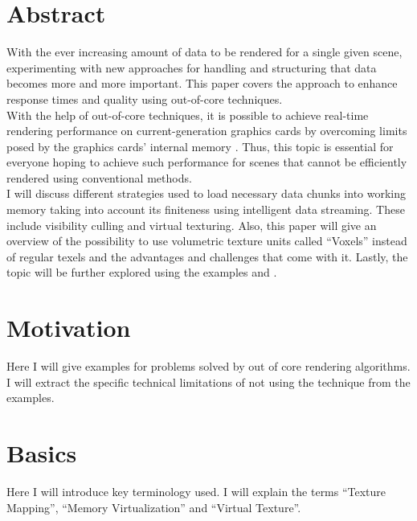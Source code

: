 
\chapter{Abstract}
\label{ch:Abstract}

With the ever increasing amount of data to be rendered for a single given scene, experimenting with new approaches for handling and structuring that data becomes more and more important. This paper covers the approach to enhance response times and quality using out-of-core techniques. \\

With the help of out-of-core techniques, it is possible to achieve real-time rendering performance on current-generation graphics cards by overcoming limits posed by the graphics cards' internal memory \cite{Crassin:2009:GRS:1507149.1507152}. Thus, this topic is essential for everyone hoping to achieve such performance for scenes that cannot be efficiently rendered using conventional methods. \\

I will discuss different strategies used to load necessary data chunks into working memory taking into account its finiteness using intelligent data streaming. These include visibility culling and virtual texturing. Also, this paper will give an overview of the possibility to use volumetric texture units called ``Voxels'' instead of regular texels and the advantages and challenges that come with it. Lastly, the topic will be further explored using the examples \cite{Crassin:2009:GRS:1507149.1507152} and \cite{van2009id}.
%



\chapter{Motivation}
\label{ch:Motivation}

Here I will give examples for problems solved by out of core rendering algorithms. I will extract the specific technical limitations of not using the technique from the examples.

\chapter{Basics}
\label{ch:Basics}

Here I will introduce key terminology used. I will explain the terms ``Texture Mapping'', ``Memory Virtualization'' and ``Virtual Texture''.

